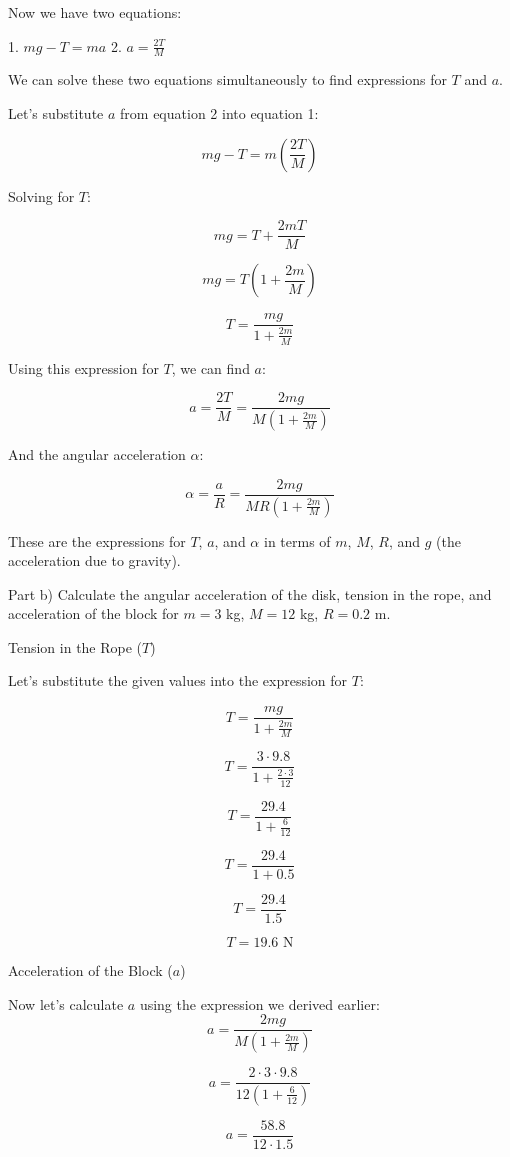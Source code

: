 Now we have two equations:

1. \( m g - T = m a \)
2. \( a = \frac{2T}{M} \)

We can solve these two equations simultaneously to find expressions for \( T \) and \( a \).

Let's substitute \( a \) from equation 2 into equation 1:

\[
m g - T = m \left( \frac{2T}{M} \right)
\]

Solving for \( T \):

\[
m g = T + \frac{2mT}{M}
\]

\[
m g = T \left( 1 + \frac{2m}{M} \right)
\]

\[
T = \frac{m g}{1 + \frac{2m}{M}}
\]

Using this expression for \( T \), we can find \( a \):

\[
a = \frac{2T}{M} = \frac{2m g}{M \left( 1 + \frac{2m}{M} \right)}
\]

And the angular acceleration \( \alpha \):

\[
\alpha = \frac{a}{R} = \frac{2m g}{M R \left( 1 + \frac{2m}{M} \right)}
\]

These are the expressions for \( T \), \( a \), and \( \alpha \) in terms of \( m \), \( M \), \( R \), and \( g \) (the acceleration due to gravity).

Part b) Calculate the angular acceleration of the disk, tension in the rope, and acceleration of the block for \( m = 3 \) kg, \( M = 12 \) kg, \( R = 0.2 \) m.

Tension in the Rope (\( T \))

Let's substitute the given values into the expression for \( T \):

\[
T = \frac{m g}{1 + \frac{2m}{M}}
\]

\[
T = \frac{3 \cdot 9.8}{1 + \frac{2 \cdot 3}{12}}
\]

\[
T = \frac{29.4}{1 + \frac{6}{12}}
\]

\[
T = \frac{29.4}{1 + 0.5}
\]

\[
T = \frac{29.4}{1.5}
\]

\[
T = 19.6 \text{ N}
\]

Acceleration of the Block (\( a \))

Now let's calculate \( a \) using the expression we derived earlier:
\[
a = \frac{2m g}{M \left( 1 + \frac{2m}{M} \right)}
\]

\[
a = \frac{2 \cdot 3 \cdot 9.8}{12 \left( 1 + \frac{6}{12} \right)}
\]

\[
a = \frac{58.8}{12 \cdot 1.5}
\]

